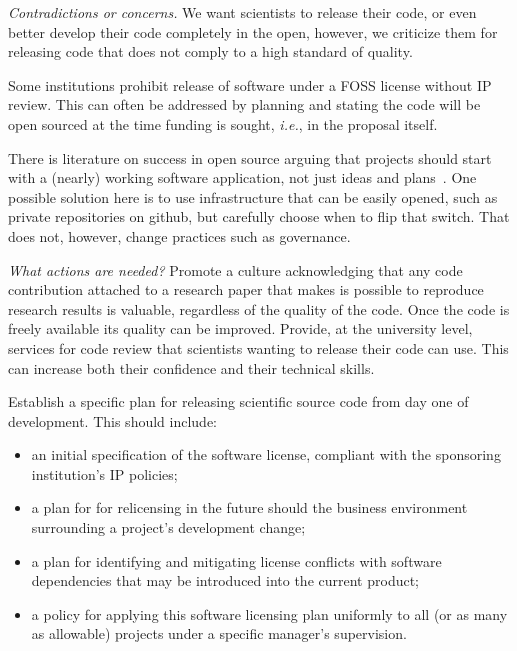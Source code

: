 \documentclass[a4paper,UKenglish]{dagman}
\newcommand{\ie}{\emph{i.e.},\xspace}
\begin{document}
\emph{Contradictions or concerns.}
We want scientists to release their code, or even better develop their code completely in the open, however, we criticize them for releasing code that does not comply to a high standard of quality. 

Some institutions prohibit release of software under a FOSS license without IP review. This can often be addressed by planning and stating the code will be open sourced at the time funding is sought, \ie in the proposal itself.

There is literature on success in open source arguing that projects should start with a (nearly) working software application, not just ideas and plans~\cite{senyard2004have}. One possible solution here is to use infrastructure that can be easily opened, such as private repositories on github, but carefully choose when to flip that switch. That does not, however, change practices such as governance.



\emph{What actions are needed?}
Promote a culture acknowledging that any code contribution attached to a research paper that makes is possible to reproduce research results is valuable, regardless of the quality of the code. Once the code is freely available its quality can be improved.
Provide, at the university level, services for code review that scientists wanting to release their code can use. This can increase both their confidence and their technical skills. 


Establish a specific plan for releasing scientific source code from day one of development. This should include:
\begin{itemize}
\item an initial specification of the software license, compliant with the sponsoring institution's IP policies;
\item a plan for for relicensing in the future should the business environment surrounding a project's development change;
\item a plan for identifying and mitigating license conflicts with software dependencies that may be introduced into the current product;
\item a policy for applying this software licensing plan uniformly to all (or as many as allowable) projects under a specific manager's supervision. 
\end{itemize}
\end{document}
